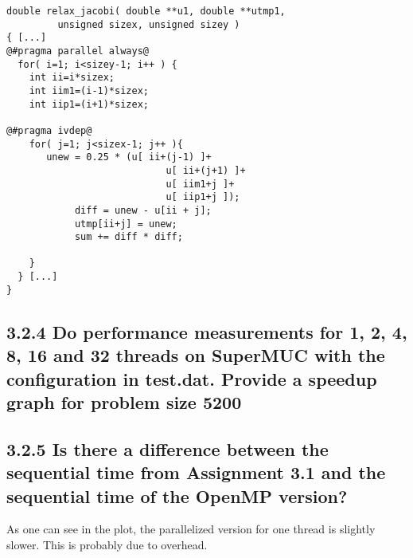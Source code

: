 \begin{lstlisting}
double relax_jacobi( double **u1, double **utmp1,
         unsigned sizex, unsigned sizey )
{ [...]
@#pragma parallel always@
  for( i=1; i<sizey-1; i++ ) {
  	int ii=i*sizex;
  	int iim1=(i-1)*sizex;
  	int iip1=(i+1)*sizex;

@#pragma ivdep@
    for( j=1; j<sizex-1; j++ ){
       unew = 0.25 * (u[ ii+(j-1) ]+
        		            u[ ii+(j+1) ]+
        		            u[ iim1+j ]+
        		            u[ iip1+j ]);
		    diff = unew - u[ii + j];
		    utmp[ii+j] = unew;
		    sum += diff * diff;

    }
  } [...]
}
\end{lstlisting}

\subsection*{3.2.4 Do performance measurements for 1, 2, 4, 8, 16 and 32 threads on SuperMUC with the configuration in test.dat. Provide a speedup graph for problem size 5200}

\iffalse
	\begin{tikzpicture}[every node near coord/.style={anchor=\alignment}]
		\begin{axis}[
			legend style={cells={align=left}},
			xtick={1,2,4,8,16,32},
			xlabel=\#threads,
			ylabel=speedup vs sequential execution,
			title=Speedup of icc auto parallelization,
			legend pos = outer north east,
			nodes near coords,
			no markers]
			\addplot[color=red] table {plots/res_speedups.out};.
		\end{axis}
	\end{tikzpicture}
\fi

\subsection*{3.2.5 Is there a difference between the sequential time from Assignment 3.1 and the sequential time of the OpenMP version?}
As one can see in the plot, the parallelized version for one thread is slightly slower. This is probably due to overhead.

